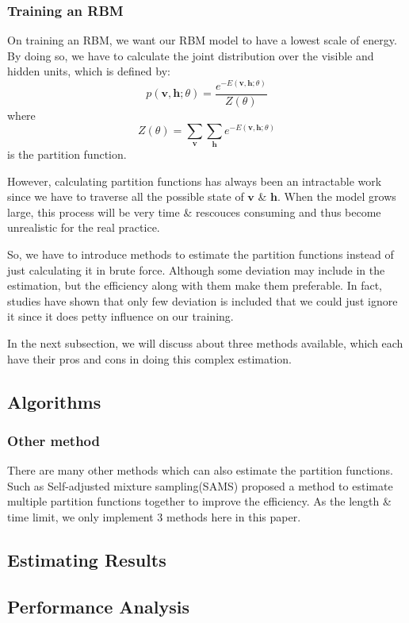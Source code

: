 \subsubsection{Training an RBM}
On training an RBM, we want our RBM model to have a lowest scale of energy. By doing so, we have to calculate the joint distribution over the visible and hidden units, which is defined by:
\begin{equation}
	p(\mathbf v,\mathbf h;\theta)=\frac{e^{-E(\mathbf v,\mathbf h;\theta)}}{Z(\theta)}
\end{equation}
where
\begin{equation}
	Z(\theta)=\sum_{\mathbf v} \sum_{\mathbf h} e^{-E(\mathbf v,\mathbf h;\theta)}
\end{equation}
is the partition function.

However, calculating partition functions has always been an intractable work since we have to traverse all the possible state of $\mathbf v$ \& $\mathbf h$.
When the model grows large, this process will be very time \& rescouces consuming and thus become unrealistic for the real practice.

So, we have to introduce methods to estimate the partition functions instead of just calculating it in brute force. Although some deviation may include in the estimation, but the efficiency along with them make them preferable. In fact, studies have shown that only few deviation is included that we could just ignore it since it does petty influence on our training.

In the next subsection, we will discuss about three methods available, which each have their pros and cons in doing this complex estimation.



\subsection{Algorithms}





\subsubsection{Other method}
There are many other methods which can also estimate the partition functions. Such as Self-adjusted mixture sampling(SAMS)\cite{tan2015optimally} proposed a method to estimate multiple partition functions together to improve the efficiency. As the length \& time limit, we only implement 3 methods here in this paper.


\subsection{Estimating Results}



\subsection{Performance Analysis}
\subsubsection{}


